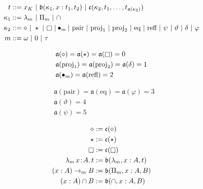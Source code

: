 
\begin{figure}
    \centering
    \begin{align*}
        t &::= x_K\ |\ \mathfrak{b}(\kappa_1, x : t_1, t_2)\ |\ \mathfrak{c}(\kappa_2, t_1, \ldots, t_{\mathfrak{a}(\kappa_2)}) \\
        \kappa_1 &::= \lambda_m\ |\ \Pi_m\ |\ \cap \\
        \kappa_2 &::=\diamond\ |\ \star\ |\ \kind\ | \bullet_m |\ \text{pair}\ |\ \text{proj}_1\ |\ \text{proj}_2\ |\ \text{eq}\ |\ \text{refl}\ |\ \psi\ |\ \vartheta\ |\ \delta\ |\ \varphi  \\
        m &::= \omega\ |\ 0\ |\ \tau
    \end{align*}
    \vspace{-.3in}
    \begin{minipage}{0.5\textwidth}
        \begin{align*}
            &\mathfrak{a}(\diamond) = \mathfrak{a}(\star) = \mathfrak{a}(\kind) = 0 \\
            &\mathfrak{a}(\text{proj}_1) = \mathfrak{a}(\text{proj}_2) = \mathfrak{a}(\delta) = 1 \\
            &\mathfrak{a}(\bullet_m) = \mathfrak{a}(\text{refl}) = 2
        \end{align*}
    \end{minipage}%
    \begin{minipage}{0.5\textwidth}
        \begin{align*}
            &\mathfrak{a}(\text{pair}) = \mathfrak{a}(\text{eq}) = \mathfrak{a}(\varphi) = 3 \\
            &\mathfrak{a}(\vartheta) = 4 \\
            &\mathfrak{a}(\psi) =  5
        \end{align*}
    \end{minipage}
    \begin{minipage}{0.5\textwidth}
        \begin{align*}
            \diamond &:= \mathfrak{c}(\diamond) \\
            \star &:= \mathfrak{c}(\star) \\
            \kind &:= \mathfrak{c}(\kind) \\
            \abs{\lambda_m}{x}{A}{t} &:= \mathfrak{b}(\lambda_m, x : A, t) \\
            (x : A) \to_m B &:= \mathfrak{b}(\Pi_m, x : A, B) \\
            (x : A) \cap B &:= \mathfrak{b}(\cap, x : A, B) \\

\end{align*}
\end{minipage}
\end{figure}
